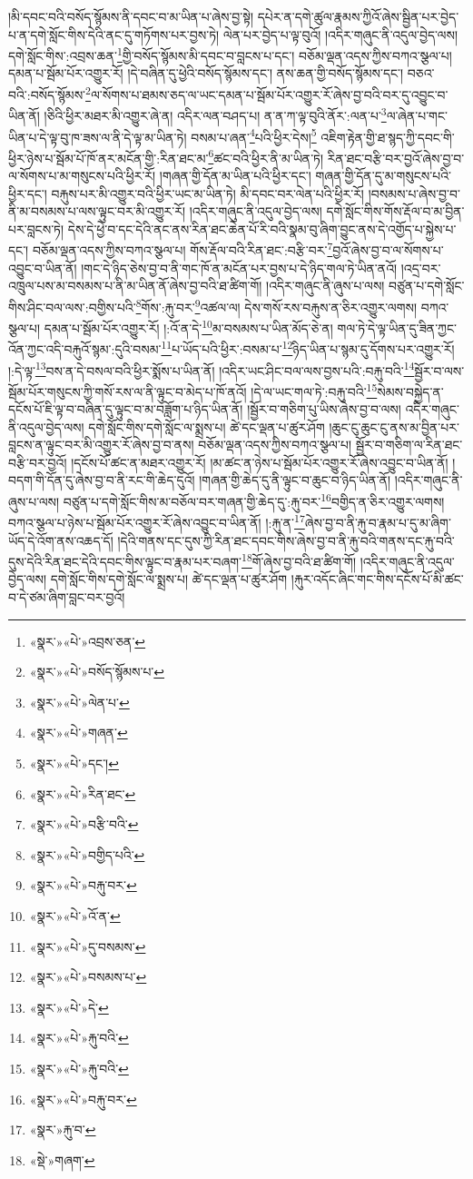 །མི་དབང་བའི་བསོད་སྙོམས་ནི་དབང་བ་མ་ཡིན་པ་ཞེས་བྱ་སྟེ། དཔེར་ན་དགེ་ཚུལ་རྣམས་ཀྱིའོ་ཞེས་སྦྱིན་པར་བྱེད་པ་ན་དགེ་སློང་གིས་དེའི་ནང་དུ་གཏོགས་པར་བྱས་ཏེ། ལེན་པར་བྱེད་པ་ལྟ་བུའོ། །འདིར་གཞུང་ནི་འདུལ་བྱེད་ལས། དགེ་སློང་གིས་:འབྲས་ཆན་\footnote{«སྣར་»«པེ་»འབྲས་ཅན་}གྱི་བསོད་སྙོམས་མི་དབང་བ་བླངས་པ་དང་། བཅོམ་ལྡན་འདས་ཀྱིས་བཀའ་སྩལ་པ། དམན་པ་སྦོམ་པོར་འགྱུར་རོ། །དེ་བཞིན་དུ་ཕྱེའི་བསོད་སྙོམས་དང་། ནས་ཆན་གྱི་བསོད་སྙོམས་དང་། བཅའ་བའི་:བསོད་སྙོམས་\footnote{«སྣར་»«པེ་»བསོད་སྙོམས་པ་}ལ་སོགས་པ་ཐམས་ཅད་ལ་ཡང་དམན་པ་སྦོམ་པོར་འགྱུར་རོ་ཞེས་བྱ་བའི་བར་དུ་འབྱུང་བ་ཡིན་ནོ། །ཅིའི་ཕྱིར་མཐར་མི་འགྱུར་ཞེ་ན། འདིར་ལན་བཤད་པ། ན་ན་ཀ་ལྟ་བུའི་ནོར་:ལན་པ་\footnote{«སྣར་»«པེ་»ལེན་པ་}ལ་ཞེན་པ་གང་ཡིན་པ་དེ་ལྟ་བུ་ཁ་ཟས་ལ་ནི་དེ་ལྟ་མ་ཡིན་ཏེ། བསམ་པ་ཞན་\footnote{«སྣར་»«པེ་»གཞན་}པའི་ཕྱིར་དེས།\footnote{«སྣར་»«པེ་»དང་།} འཇིག་རྟེན་གྱི་ཐ་སྙད་ཀྱི་དབང་གི་ཕྱིར་ཉེས་པ་སྦོམ་པོ་ཁོ་ནར་མངོན་གྱི་:རིན་ཐང་མ་\footnote{«སྣར་»«པེ་»རིན་ཐང་}ཚང་བའི་ཕྱིར་ནི་མ་ཡིན་ཏེ། རིན་ཐང་བརྩི་བར་བྱའོ་ཞེས་བྱ་བ་ལ་སོགས་པ་མ་གསུངས་པའི་ཕྱིར་རོ། །གཞན་གྱི་དོན་མ་ཡིན་པའི་ཕྱིར་དང་། གཞན་གྱི་དོན་དུ་མ་གསུངས་པའི་ཕྱིར་དང་། བརྐུས་པར་མི་འགྱུར་བའི་ཕྱིར་ཡང་མ་ཡིན་ཏེ། མི་དབང་བར་ལེན་པའི་ཕྱིར་རོ། །བསམས་པ་ཞེས་བྱ་བ་ནི་མ་བསམས་པ་ལས་ལྟུང་བར་མི་འགྱུར་རོ། །འདིར་གཞུང་ནི་འདུལ་བྱེད་ལས། དགེ་སློང་གིས་གོས་རྡོལ་བ་མ་བྱིན་པར་བླངས་ཏེ། དེས་དེ་ཕྱེ་བ་དང་དེའི་ནང་ནས་རིན་ཐང་ཆེན་པོ་རི་བའི་སྣམ་བུ་ཞིག་བྱུང་ནས་དེ་འགྱོད་པ་སྐྱེས་པ་དང་། བཅོམ་ལྡན་འདས་ཀྱིས་བཀའ་སྩལ་པ། གོས་རྡོལ་བའི་རིན་ཐང་:བརྩི་བར་\footnote{«སྣར་»«པེ་»བརྩི་བའི་}བྱའོ་ཞེས་བྱ་བ་ལ་སོགས་པ་འབྱུང་བ་ཡིན་ནོ། །གང་དེ་ཉིད་ཅེས་བྱ་བ་ནི་གང་ཁོ་ན་མངོན་པར་བྱས་པ་དེ་ཉིད་གལ་ཏེ་ཡིན་ནའོ། །འདྲ་བར་འཁྲུལ་པས་མ་བསམས་པ་ནི་མ་ཡིན་ནོ་ཞེས་བྱ་བའི་ཐ་ཚིག་གོ། །འདིར་གཞུང་ནི་ཞུས་པ་ལས། བཙུན་པ་དགེ་སློང་གིས་ཤིང་བལ་ལས་:བགྱིས་པའི་\footnote{«སྣར་»«པེ་»བགྱིད་པའི་}གོས་:རྐུ་བར་\footnote{«སྣར་»«པེ་»བརྐུ་བར་}འཚལ་ལ། དེས་གསོ་རས་བརྐུས་ན་ཅིར་འགྱུར་ལགས། བཀའ་སྩལ་པ། དམན་པ་སྦོམ་པོར་འགྱུར་རོ། །:འོ་ན་དེ་\footnote{«སྣར་»«པེ་»འོ་ན་}མ་བསམས་པ་ཡིན་མོད་ཅེ་ན། གལ་ཏེ་དེ་ལྟ་ཡིན་དུ་ཟིན་ཀྱང་འོན་ཀྱང་འདི་བརྐུའོ་སྙམ་:དུའི་བསམ་\footnote{«སྣར་»«པེ་»དུ་བསམས་}པ་ཡོད་པའི་ཕྱིར་:བསམ་པ་\footnote{«སྣར་»«པེ་»བསམས་པ་}ཉིད་ཡིན་པ་སྙམ་དུ་དོགས་པར་འགྱུར་རོ། །:དེ་ལྟ་\footnote{«སྣར་»«པེ་»དེ་}བས་ན་དེ་བསལ་བའི་ཕྱིར་སྨོས་པ་ཡིན་ནོ། །འདིར་ཡང་ཤིང་བལ་ལས་བྱས་པའི་:བརྐུ་བའི་\footnote{«སྣར་»«པེ་»རྐུ་བའི་}སྦྱོར་བ་ལས་སྦོམ་པོར་གསུངས་ཀྱི་གསོ་རས་ལ་ནི་ལྟུང་བ་མེད་པ་ཁོ་ནའོ། །དེ་ལ་ཡང་གལ་ཏེ་:བརྐུ་བའི་\footnote{«སྣར་»«པེ་»རྐུ་བའི་}སེམས་བསྐྱེད་ན་དངོས་པོ་ཇི་ལྟ་བ་བཞིན་དུ་ལྟུང་བ་མ་བཟློག་པ་ཉིད་ཡིན་ནོ། །སྦྱོར་བ་གཅིག་པུ་ཡིས་ཞེས་བྱ་བ་ལས། འདིར་གཞུང་ནི་འདུལ་བྱེད་ལས། དགེ་སློང་གིས་དགེ་སློང་ལ་སྨྲས་པ། ཚེ་དང་ལྡན་པ་ཚུར་ཤོག །ཆུང་ངུ་ཆུང་ངུ་ནས་མ་བྱིན་པར་བླངས་ན་ལྟུང་བར་མི་འགྱུར་རོ་ཞེས་བྱ་བ་ནས། བཅོམ་ལྡན་འདས་ཀྱིས་བཀའ་སྩལ་པ། སྦྱོར་བ་གཅིག་ལ་རིན་ཐང་བརྩི་བར་བྱའོ། །དངོས་པོ་ཚང་ན་མཐར་འགྱུར་རོ། །མ་ཚང་ན་ཉེས་པ་སྦོམ་པོར་འགྱུར་རོ་ཞེས་འབྱུང་བ་ཡིན་ནོ། །བདག་གི་དོན་དུ་ཞེས་བྱ་བ་ནི་རང་གི་ཆེད་དུའོ། །གཞན་གྱི་ཆེད་དུ་ནི་ལྟུང་བ་ཆུང་བ་ཉིད་ཡིན་ནོ། །འདིར་གཞུང་ནི་ཞུས་པ་ལས། བཙུན་པ་དགེ་སློང་གིས་མ་བཅོལ་བར་གཞན་གྱི་ཆེད་དུ་:རྐུ་བར་\footnote{«སྣར་»«པེ་»བརྐུ་བར་}བགྱིད་ན་ཅིར་འགྱུར་ལགས། བཀའ་སྩལ་པ་ཉེས་པ་སྦོམ་པོར་འགྱུར་རོ་ཞེས་འབྱུང་བ་ཡིན་ནོ། །:རྐུ་ན་\footnote{«སྣར་»རྐུ་བ་}ཞེས་བྱ་བ་ནི་རྐུ་བ་རྣམ་པ་དུ་མ་ཞིག་ཡོད་དེ་འོག་ནས་འཆད་དོ། །དེའི་གནས་དང་དུས་ཀྱི་རིན་ཐང་དབང་གིས་ཞེས་བྱ་བ་ནི་རྐུ་བའི་གནས་དང་རྐུ་བའི་དུས་དེའི་རིན་ཐང་དེའི་དབང་གིས་ལྟུང་བ་རྣམ་པར་བཞག་\footnote{«སྡེ་»གཞག་}གོ་ཞེས་བྱ་བའི་ཐ་ཚིག་གོ། །འདིར་གཞུང་ནི་འདུལ་བྱེད་ལས། དགེ་སློང་གིས་དགེ་སློང་ལ་སྨྲས་པ། ཚེ་དང་ལྡན་པ་ཚུར་ཤོག །རྐུར་འདོང་ཞིང་གང་གིས་དངོས་པོ་མི་ཚང་བ་དེ་ཙམ་ཞིག་བླང་བར་བྱའོ། 